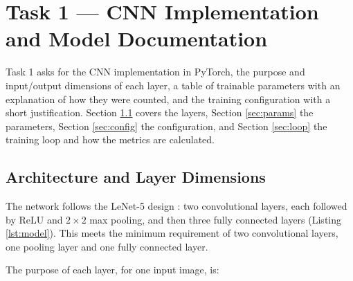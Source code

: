 \chapter{Task 1 --- CNN Implementation and Model Documentation}
\label{ch:task1}


Task 1 asks for the CNN implementation in PyTorch, the purpose and
input/output dimensions of each layer, a table of trainable parameters
with an explanation of how they were counted, and the training
configuration with a short justification. Section \ref{sec:model} covers
the layers, Section \ref{sec:params} the parameters, Section
\ref{sec:config} the configuration, and Section \ref{sec:loop} the
training loop and how the metrics are calculated.


\section{Architecture and Layer Dimensions}
\label{sec:model}

The network follows the LeNet-5 design \citep{lecun1998}: two
convolutional layers, each followed by ReLU and $2 \times 2$ max pooling,
and then three fully connected layers (Listing \ref{lst:model}). This
meets the minimum requirement of two convolutional layers, one pooling
layer and one fully connected layer.



The purpose of each layer, for one input image, is:


